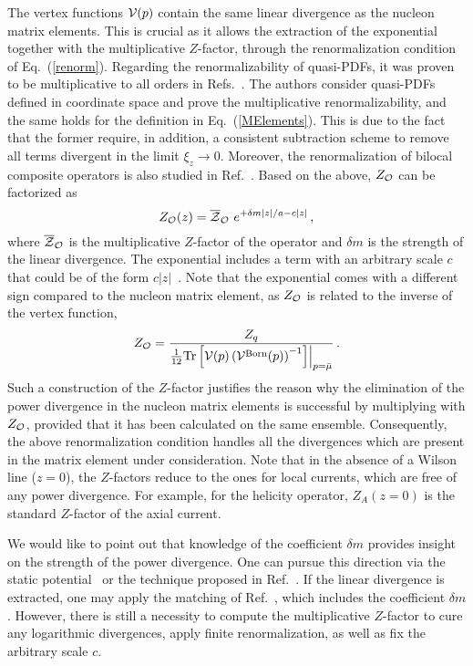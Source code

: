 \documentclass[12pt,tighten,nofootinbib,amssymb,floatfix]{article}
\newcommand{\be}{\begin{equation}}
\newcommand{\ee}{\end{equation}}
\begin{document}
\medskip
The vertex functions ${\cal V}(p)$ contain the same linear divergence as the nucleon matrix elements. 
This is crucial as it allows the extraction of the exponential together with the multiplicative $Z$-factor, 
through the renormalization condition of Eq.~(\ref{renorm}). Regarding the renormalizability of quasi-PDFs, 
it was proven to be multiplicative to all orders in Refs.~\cite{Ishikawa:2016znu,Ishikawa:2017faj}. 
The authors consider quasi-PDFs defined in coordinate space and prove the multiplicative renormalizability, 
and the same holds for the definition in Eq.~(\ref{MElements}). This is due to the fact that the former require, 
in addition, a consistent subtraction scheme to remove all terms divergent in the limit $\xi_z\rightarrow 0$. 
Moreover, the renormalization of bilocal composite operators is also studied in Ref.~\cite{Ishikawa:2016znu,Ishikawa:2017faj}. 
Based on the above, $Z_{\cal O}$ can be factorized as
\be
Z_{\cal O}(z) = \overline{\cal Z}_{\cal O} \,\, e^{+\delta m |z|/a - c |z|}\,,
\ee
where $\overline{\cal Z}_{\cal O}$ is the multiplicative $Z$-factor of the operator and $\delta m$ is the strength of the linear divergence.
The exponential includes a term with an arbitrary scale $c$ that could be of the form $c|z|$~\cite{Sommer:2015hea}. Note that the exponential comes with a 
different sign compared to the nucleon matrix element, as $Z_{\cal O}$ is related to the inverse 
of the vertex function,
\be
Z_{\cal O} = \frac{Z_q}{\frac{1}{12} {\rm Tr} \left[{\cal V}(p) \left({\cal V}^{\rm Born}(p)\right)^{-1}\right] \Bigr|_{p=\bar\mu} }\,.
\ee
Such a construction of the $Z$-factor justifies the reason why the elimination of the power divergence in the nucleon matrix elements is successful
by multiplying with $Z_{\cal O}$, provided that it has been calculated on the same ensemble.
Consequently, the above renormalization condition handles all the divergences which are present in the matrix element under 
consideration. Note that in the absence of a Wilson line ($z{=}0$), the $Z$-factors reduce to the ones for local currents,
which are free of any power divergence. For example, for the helicity operator, $Z_A(z{=}0)$ is the standard $Z$-factor 
of the axial current.

\medskip
We would like to point out that knowledge of the coefficient $\delta m$ provides insight on the strength of the power divergence.
One can pursue this direction via the static potential~\cite{Ishikawa:2016znu} or the technique proposed in Ref.~\cite{Constantinou:2017sej}. 
If the linear divergence is extracted, one may apply the matching of Ref.~\cite{Chen:2016fxx}, which includes the coefficient $\delta m$.
However, there is still a necessity to compute the multiplicative $Z$-factor to cure any logarithmic divergences, apply finite 
renormalization, as well as fix the arbitrary scale $c$. 
\end{document}
